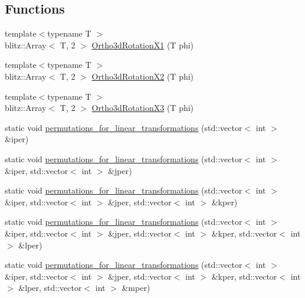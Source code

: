 \subsection*{Functions}
\begin{DoxyCompactItemize}
\item 
{\footnotesize template$<$typename T $>$ }\\blitz\+::\+Array$<$ T, 2 $>$ \mbox{\hyperlink{namespacempc_1_1transformation_a2cb0d2e69b01e0619a0313fc1204c5cb}{Ortho3d\+Rotation\+X1}} (T phi)
\item 
{\footnotesize template$<$typename T $>$ }\\blitz\+::\+Array$<$ T, 2 $>$ \mbox{\hyperlink{namespacempc_1_1transformation_a07d7aa705b1fb07b23654ddbf59d26cc}{Ortho3d\+Rotation\+X2}} (T phi)
\item 
{\footnotesize template$<$typename T $>$ }\\blitz\+::\+Array$<$ T, 2 $>$ \mbox{\hyperlink{namespacempc_1_1transformation_a90b43e27ef2f6b2178a3d028ad9f1b5b}{Ortho3d\+Rotation\+X3}} (T phi)
\item 
static void \mbox{\hyperlink{namespacempc_1_1transformation_a6c0602af1848eb67e177f64e998be7d9}{permutations\+\_\+for\+\_\+linear\+\_\+transformations}} (std\+::vector$<$ int $>$ \&iper)
\item 
static void \mbox{\hyperlink{namespacempc_1_1transformation_a3664709e95bf23f8ba76cda0b7297de4}{permutations\+\_\+for\+\_\+linear\+\_\+transformations}} (std\+::vector$<$ int $>$ \&iper, std\+::vector$<$ int $>$ \&jper)
\item 
static void \mbox{\hyperlink{namespacempc_1_1transformation_a6d9e9faa8600ee2e18d4a42b5d5cd4ef}{permutations\+\_\+for\+\_\+linear\+\_\+transformations}} (std\+::vector$<$ int $>$ \&iper, std\+::vector$<$ int $>$ \&jper, std\+::vector$<$ int $>$ \&kper)
\item 
static void \mbox{\hyperlink{namespacempc_1_1transformation_a302a8d3b95ab5b801298ae68a0aba67f}{permutations\+\_\+for\+\_\+linear\+\_\+transformations}} (std\+::vector$<$ int $>$ \&iper, std\+::vector$<$ int $>$ \&jper, std\+::vector$<$ int $>$ \&kper, std\+::vector$<$ int $>$ \&lper)
\item 
static void \mbox{\hyperlink{namespacempc_1_1transformation_a9971d05cb3b8e727d80995426d3de228}{permutations\+\_\+for\+\_\+linear\+\_\+transformations}} (std\+::vector$<$ int $>$ \&iper, std\+::vector$<$ int $>$ \&jper, std\+::vector$<$ int $>$ \&kper, std\+::vector$<$ int $>$ \&lper, std\+::vector$<$ int $>$ \&mper)
\item 

\end{DoxyCompactItemize}
